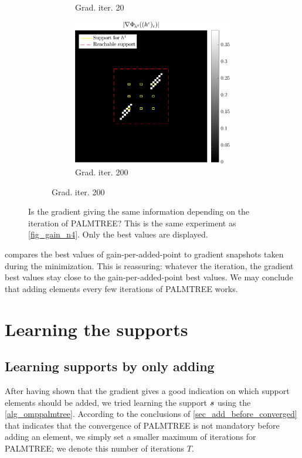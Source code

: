 \begin{figure}[!ht]
\begin{subfigure}[b]{0.49\linewidth}
\begin{subfigure}[b]{0.49\linewidth}
	\caption{Grad. iter. 20}
	\end{subfigure}
	\begin{subfigure}[b]{0.49\linewidth}\centering
	\includegraphics[width=\linewidth]{figures/xp_grad_iterations/xp_128x128_sc2_angl1_K3_S3_node4_iter200_partgrad4_bestvalues.pdf}
	\caption{Grad. iter. 200}
	\end{subfigure}
\end{subfigure}
\caption{Is the gradient giving the same information depending on the iteration of \ac{PALMTREE}? This is the same experiment as \cref{fig_gain_n4}. Only the best values are displayed.}\label{fig_iter_gain_vs_grad}
\end{figure}

 compares the best values of gain-per-added-point to gradient snapshots taken during the minimization. This is reassuring: whatever the iteration, the gradient best values stay close to the gain-per-added-point best values. We may conclude that adding elements every few iterations of \ac{PALMTREE} works.


\section{Learning the supports}

\subsection{Learning supports by only adding}
After having shown that the gradient gives a good indication on which support elements should be added, we tried learning the support $\bm{s}$ using the \cref{alg_omppalmtree}. According to the conclusions of \cref{sec_add_before_converged} that indicates that the convergence of \ac{PALMTREE} is not mandatory before adding an element, we simply set a smaller maximum of iterations for \ac{PALMTREE}; we denote this number of iterations $T$.

